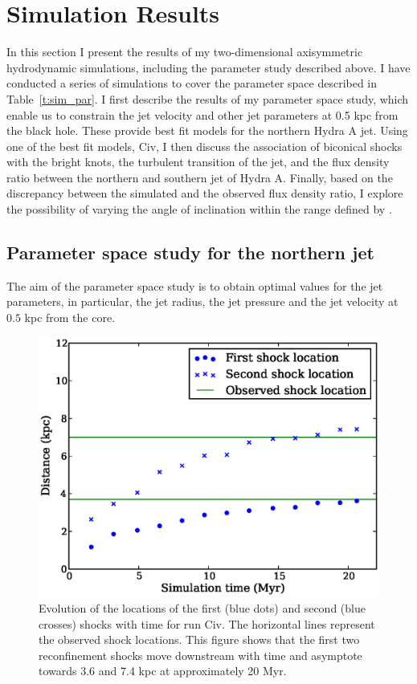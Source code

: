 \section{Simulation Results}\label{s:sims}

In this section I present the results of my two-dimensional axisymmetric hydrodynamic simulations, including the parameter study described above. I have conducted a series of simulations to cover the parameter space described in 
Table~\ref{t:sim_par}. I first describe the results of my  parameter space study, which enable us to constrain the jet velocity and other jet parameters at 0.5 kpc from the black hole. These provide best fit models for the northern Hydra A jet. Using one of the best fit models, Civ, I then discuss the association of biconical shocks with the bright knots, the turbulent transition of the jet, and the flux density ratio between the northern and southern jet of Hydra A. Finally, based on the discrepancy between the simulated and the observed flux density ratio, I explore the possibility of varying the angle of inclination within the range defined by \citet{taylor93}. 

%
%

\subsection{Parameter space study for the northern jet}\label{s:param_study}

The aim of the parameter space study is to obtain optimal values for the jet parameters, in particular, the jet radius, the jet pressure and the jet velocity at $0.5$ kpc from the core.

\begin{figure}
\includegraphics[width=\linewidth]{css.eps}
\caption{
Evolution of the locations of the first (blue dots) and second (blue crosses) shocks with time for run Civ. The horizontal lines represent the observed shock locations. This figure shows that the first two reconfinement shocks move downstream with time and asymptote towards  3.6 and 7.4 kpc at approximately 20 Myr. }
\label{f:s_ev}
\end{figure}

